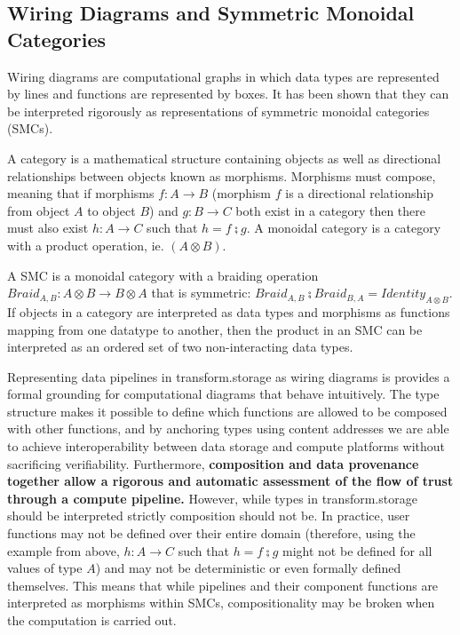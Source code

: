 \documentclass[9pt, oneside]{article}   	%
\begin{document}
\subsection{Wiring Diagrams and Symmetric Monoidal Categories}\label{smc}

Wiring diagrams are computational graphs in which data types are represented by lines and functions are represented by boxes. It has been shown that they can be interpreted rigorously as representations of symmetric monoidal categories (SMCs). \cite{Patterson_2021} 


A category is a mathematical structure containing objects as well as directional relationships between objects known as morphisms. Morphisms must compose, meaning that if morphisms $f : A \rightarrow B$ (morphism $f$ is a directional relationship from object $A$ to object $B$) and $g : B \rightarrow C$ both exist in a category then there must also exist $h : A \rightarrow C$ such that $h = f \zcmp g$. A monoidal category is a category with a product operation, ie. $(A \otimes B)$. 

A SMC is a monoidal category with a braiding operation $Braid_{A,B} : A \otimes B \rightarrow B \otimes A$ that is symmetric: $Braid_{A,B} \zcmp Braid_{B,A}=Identity_{A \otimes B}$. If objects in a category are interpreted as data types and morphisms as functions mapping from one datatype to another, then the product in an SMC can be interpreted as an ordered set of two non-interacting data types. 

Representing data pipelines in transform.storage as wiring diagrams is provides a formal grounding for computational diagrams that behave intuitively. The type structure makes it possible to define which functions are allowed to be composed with other functions, and by anchoring types using content addresses we are able to achieve interoperability between data storage and compute platforms without sacrificing verifiability. Furthermore, \textbf{composition and data provenance together allow a rigorous and automatic assessment of the flow of trust through a compute pipeline.}  However, while types in transform.storage should be interpreted strictly composition should not be. In practice, user functions may not be defined over their entire domain (therefore, using the example from above, $h : A \rightarrow C$ such that $h = f \zcmp g$ might not be defined for all values of type $A$) and may not be deterministic or even formally defined themselves. This means that while pipelines and their component functions are interpreted as morphisms within SMCs, compositionality may be broken when the computation is carried out. 
\end{document}
